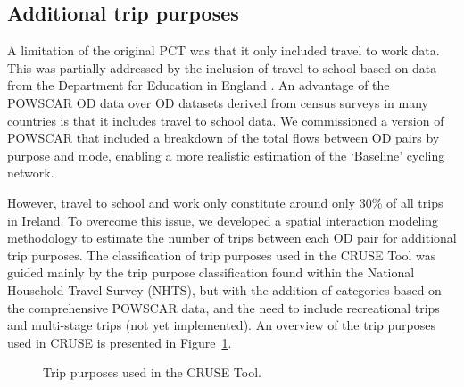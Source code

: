 \documentclass[
  super,
  preprint,
  3p]{elsarticle}
\begin{document}
\subsection{Additional trip purposes}\label{sec-trip-purposes}

A limitation of the original PCT was that it only included travel to
work data. This was partially addressed by the inclusion of travel to
school based on data from the Department for Education in England
\citep{goodman2019}. An advantage of the POWSCAR OD data over OD
datasets derived from census surveys in many countries is that it
includes travel to school data. We commissioned a version of POWSCAR
that included a breakdown of the total flows between OD pairs by purpose
and mode, enabling a more realistic estimation of the `Baseline' cycling
network.

However, travel to school and work only constitute around only 30\% of
all trips in Ireland. To overcome this issue, we developed a spatial
interaction modeling methodology to estimate the number of trips between
each OD pair for additional trip purposes. The classification of trip
purposes used in the CRUSE Tool was guided mainly by the trip purpose
classification found within the National Household Travel Survey (NHTS),
but with the addition of categories based on the comprehensive POWSCAR
data, and the need to include recreational trips and multi-stage trips
(not yet implemented). An overview of the trip purposes used in CRUSE is
presented in Figure~\ref{fig-trip-purposes}.

\begin{figure}


\caption{\label{fig-trip-purposes}Trip purposes used in the CRUSE Tool.}

\end{figure}%
\end{document}
